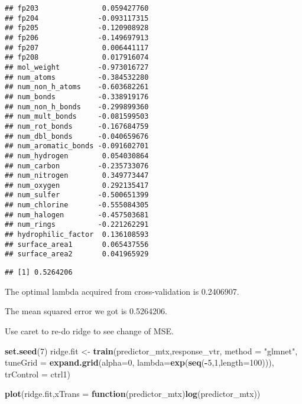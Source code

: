 \documentclass[]{article}
\newenvironment{Shaded}{\begin{snugshade}}{\end{snugshade}}
\newcommand{\ControlFlowTok}[1]{\textcolor[rgb]{0.13,0.29,0.53}{\textbf{#1}}}
\newcommand{\DataTypeTok}[1]{\textcolor[rgb]{0.13,0.29,0.53}{#1}}
\newcommand{\DecValTok}[1]{\textcolor[rgb]{0.00,0.00,0.81}{#1}}
\newcommand{\KeywordTok}[1]{\textcolor[rgb]{0.13,0.29,0.53}{\textbf{#1}}}
\newcommand{\NormalTok}[1]{#1}
\newcommand{\OperatorTok}[1]{\textcolor[rgb]{0.81,0.36,0.00}{\textbf{#1}}}
\newcommand{\StringTok}[1]{\textcolor[rgb]{0.31,0.60,0.02}{#1}}
\begin{document}
\begin{verbatim}
## fp203               0.059427760
## fp204              -0.093117315
## fp205              -0.120908928
## fp206              -0.149697913
## fp207               0.006441117
## fp208               0.017916074
## mol_weight         -0.973016727
## num_atoms          -0.384532280
## num_non_h_atoms    -0.603682261
## num_bonds          -0.338919176
## num_non_h_bonds    -0.299899360
## num_mult_bonds     -0.081599503
## num_rot_bonds      -0.167684759
## num_dbl_bonds      -0.040659676
## num_aromatic_bonds -0.091602701
## num_hydrogen        0.054030864
## num_carbon         -0.235733076
## num_nitrogen        0.349773447
## num_oxygen          0.292135417
## num_sulfer         -0.500651399
## num_chlorine       -0.555084305
## num_halogen        -0.457503681
## num_rings          -0.221262291
## hydrophilic_factor  0.136108593
## surface_area1       0.065437556
## surface_area2       0.041965929
\end{verbatim}

\begin{Shaded}
\end{Shaded}

\begin{verbatim}
## [1] 0.5264206
\end{verbatim}

The optimal lambda acquired from cross-validation is 0.2406907.

The mean squared error we got is 0.5264206.

Use caret to re-do ridge to see change of MSE.

\begin{Shaded}
\begin{Highlighting}[]
\KeywordTok{set.seed}\NormalTok{(}\DecValTok{7}\NormalTok{)}
\NormalTok{ridge.fit <-}\StringTok{ }\KeywordTok{train}\NormalTok{(predictor_mtx,response_vtr,}
                   \DataTypeTok{method =} \StringTok{"glmnet"}\NormalTok{,}
                   \DataTypeTok{tuneGrid =} \KeywordTok{expand.grid}\NormalTok{(}\DataTypeTok{alpha=}\DecValTok{0}\NormalTok{,}
                                        \DataTypeTok{lambda=}\KeywordTok{exp}\NormalTok{(}\KeywordTok{seq}\NormalTok{(}\OperatorTok{-}\DecValTok{5}\NormalTok{,}\DecValTok{1}\NormalTok{,}\DataTypeTok{length=}\DecValTok{100}\NormalTok{))),}
                   \DataTypeTok{trControl =}\NormalTok{ ctrl1)}

\KeywordTok{plot}\NormalTok{(ridge.fit,}\DataTypeTok{xTrans =} \ControlFlowTok{function}\NormalTok{(predictor_mtx)}\KeywordTok{log}\NormalTok{(predictor_mtx))}
\end{Highlighting}
\end{Shaded}
\end{document}
